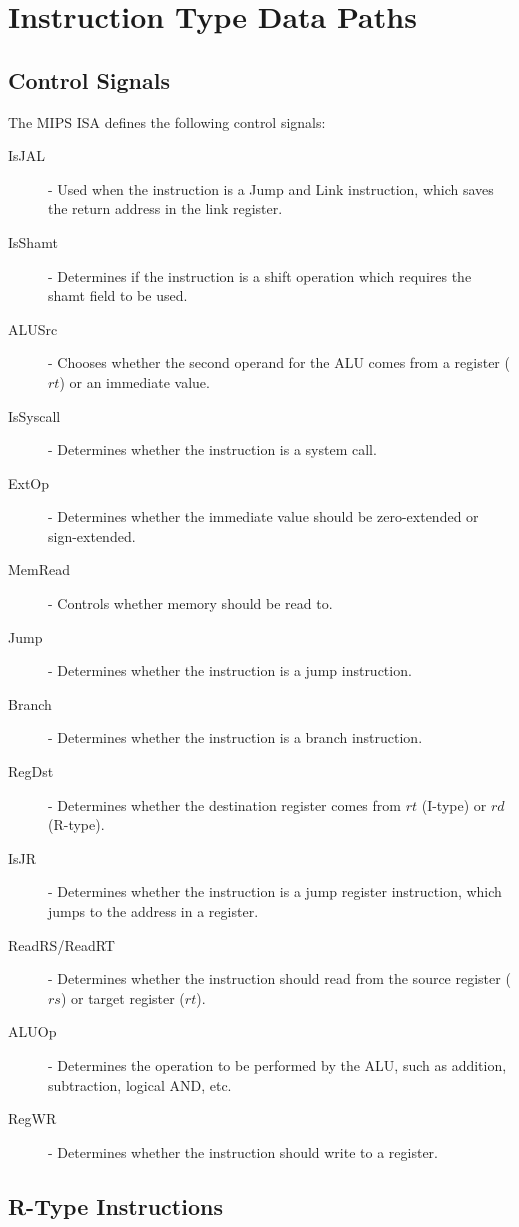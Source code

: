 \documentclass[12pt letter]{report}
\begin{document}
\chapter{Instruction Type Data Paths}

\section{Control Signals}
The MIPS ISA defines the following control signals:
\begin{description}
  \item[IsJAL] - Used when the instruction is a Jump and Link instruction, which saves the return address in the link register.
  \item[IsShamt] - Determines if the instruction is a shift operation which requires the shamt field to be used.
  \item[ALUSrc] - Chooses whether the second operand for the ALU comes from a register ($rt$) or an immediate value.
  \item[IsSyscall] - Determines whether the instruction is a system call.
  \item[ExtOp] - Determines whether the immediate value should be zero-extended or sign-extended.
  \item[MemRead] - Controls whether memory should be read to.
  \item[Jump] - Determines whether the instruction is a jump instruction.
  \item[Branch] - Determines whether the instruction is a branch instruction.
  \item[RegDst] - Determines whether the destination register comes from $rt$ (I-type) or $rd$ (R-type).
  \item[IsJR] - Determines whether the instruction is a jump register instruction, which jumps to the address in a register.
  \item[ReadRS/ReadRT] - Determines whether the instruction should read from the source register ($rs$) or target register ($rt$).
  \item[ALUOp] - Determines the operation to be performed by the ALU, such as addition, subtraction, logical AND, etc.
  \item[RegWR] - Determines whether the instruction should write to a register.
\end{description}

\section{R-Type Instructions}
\end{document}
